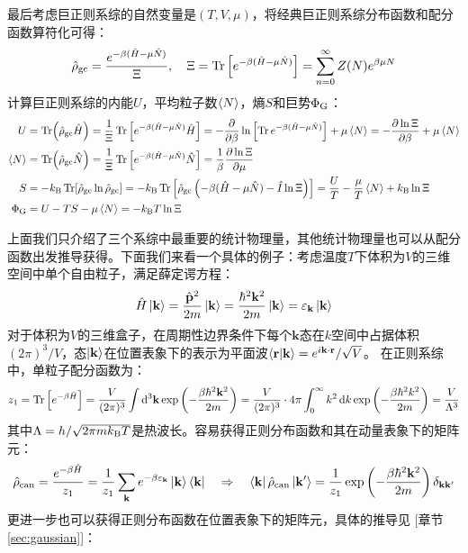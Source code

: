 \begin{theorem}[量子化的巨正则系综]
最后考虑巨正则系综的自然变量是$(T,V,\mu)$，将经典巨正则系综分布函数和配分函数算符化可得：
\[\hat{\rho}_{\rm gc}=\frac{e^{-\beta(\hat{H}-\mu\hat{N})}}{\Xi}, \quad \Xi=\Tr\left[e^{-\beta(\hat{H}-\mu\hat{N})}\right]=\sum_{n=0}^{\infty}Z(N)e^{\beta\mu N}\]
计算巨正则系综的内能$U$，平均粒子数$\expval{N}$，熵$S$和巨势$\Phi_{\rm G}$：
\[\begin{aligned}
U&=\Tr(\hat{\rho}_{\rm gc}\hat{H})=\frac{1}{\Xi}\Tr\left[e^{-\beta(\hat{H}-\mu\hat{N})}\hat{H}\right]=-\pdv{\beta}\ln\left[\Tr e^{-\beta(\hat{H}-\mu\hat{N})}\right]+\mu \expval{N}=-\pdv{\ln\Xi}{\beta}+\mu \expval{N}\\
\expval{N}&=\Tr(\hat{\rho}_{\rm gc}\hat{N})=\frac{1}{\Xi}\Tr\left[e^{-\beta(\hat{H}-\mu\hat{N})}\hat{N}\right]=\frac{1}{\beta}\pdv{\ln\Xi}{\mu}\\
S&=-k_{\rm B}\Tr[\hat{\rho}_{\rm gc}\ln\hat{\rho}_{\rm gc}]=-k_{\rm B}\Tr\left[\hat{\rho}_{\rm gc}\left(-\beta(\hat{H}-\mu\hat{N})-\hat{I}\ln \Xi\right)\right]=\frac{U}{T}-\frac{\mu}{T}\expval{N}+k_{\rm B}\ln \Xi\\
\Phi_{\rm G}&=U-TS-\mu\expval{N}=-k_{\rm B}T\ln\Xi
\end{aligned}\]
\end{theorem}
上面我们只介绍了三个系综中最重要的统计物理量，其他统计物理量也可以从配分函数出发推导获得。下面我们来看一个具体的例子：考虑温度$T$下体积为$V$的三维空间中单个自由粒子，满足薛定谔方程：
\[\hat{H}\ket{\mathbf{k}}=\frac{\hat{\mathbf{p}}^2}{2m}\ket{\mathbf{k}}=\frac{\hbar^2\mathbf{k}^2}{2m}\ket{\mathbf{k}}=\varepsilon_{\mathbf{k}}\ket{\mathbf{k}}\]
对于体积为$V$的三维盒子，在周期性边界条件下每个$\mathbf{k}$态在$k$空间中占据体积$(2\pi)^3/V$，态$\ket{\mathbf{k}}$在位置表象下的表示为平面波$\bra{\mathbf{r}}\ket{\mathbf{k}}=e^{i\mathbf{k}\cdot\mathbf{r}}/\sqrt{V}$。
在正则系综中，单粒子配分函数为：
\[z_1=\Tr\left[e^{-\beta\hat{H}}\right]=\frac{V}{(2\pi)^3}\int\dd[3]{\mathbf{k}}\exp\left(-\frac{\beta\hbar^2 \mathbf{k}^2}{2m}\right)=\frac{V}{(2\pi)^3}\cdot 4\pi\int_0^{\infty}k^2\dd{k}\exp\left(-\frac{\beta\hbar^2k^2}{2m}\right)=\frac{V}{\Lambda^3}\]
其中$\Lambda=h/\sqrt{2\pi m k_{\rm B} T}$是热波长。容易获得正则分布函数和其在动量表象下的矩阵元：
\[\hat{\rho}_{\rm can}=\frac{e^{-\beta\hat{H}}}{z_1}=\frac{1}{z_1}\sum_{\mathbf{k}}e^{-\beta\varepsilon_{\mathbf{k}}}\ket{\mathbf{k}}\bra{\mathbf{k}} \quad \Rightarrow \quad \bra{\mathbf{k}}\hat{\rho}_{\rm can}\ket{\mathbf{k}'}=\frac{1}{z_1}\exp\left(-\frac{\beta\hbar^2\mathbf{k}^2}{2m}\right)\delta_{\mathbf{k}\mathbf{k}'}\]
更进一步也可以获得正则分布函数在位置表象下的矩阵元，具体的推导见 [章节\ref{sec:gaussian}]：
